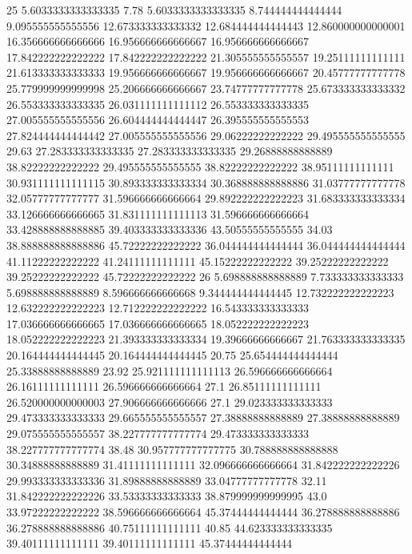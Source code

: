 25 5.6033333333333335 7.78 5.6033333333333335 8.744444444444444 9.095555555555556 12.673333333333332 12.684444444444443 12.860000000000001 16.356666666666666 16.956666666666667 16.956666666666667 17.842222222222222 17.842222222222222 21.305555555555557 19.25111111111111 21.613333333333333 19.956666666666667 19.956666666666667 20.45777777777778 25.779999999999998 25.206666666666667 23.74777777777778 25.673333333333332 26.553333333333335 26.031111111111112 26.553333333333335 27.005555555555556 26.604444444444447 26.395555555555553 27.824444444444442 27.005555555555556 29.06222222222222 29.495555555555555 29.63 27.283333333333335 27.283333333333335 29.26888888888889 38.82222222222222 29.495555555555555 38.82222222222222 38.95111111111111 30.931111111111115 30.893333333333334 30.368888888888886 31.03777777777778 32.05777777777777 31.596666666666664 29.892222222222223 31.683333333333334 33.126666666666665 31.831111111111113 31.596666666666664 33.428888888888885 39.403333333333336 43.50555555555555 34.03 38.888888888888886 45.72222222222222 36.044444444444444 36.044444444444444 41.11222222222222 41.24111111111111 45.15222222222222 39.25222222222222 39.25222222222222 45.72222222222222
26 5.698888888888889 7.733333333333333 5.698888888888889 8.596666666666668 9.344444444444445 12.732222222222223 12.632222222222223 12.712222222222222 16.543333333333333 17.036666666666665 17.036666666666665 18.052222222222223 18.052222222222223 21.393333333333334 19.39666666666667 21.763333333333335 20.164444444444445 20.164444444444445 20.75 25.654444444444444 25.33888888888889 23.92 25.921111111111113 26.596666666666664 26.16111111111111 26.596666666666664 27.1 26.85111111111111 26.520000000000003 27.906666666666666 27.1 29.023333333333333 29.473333333333333 29.665555555555557 27.38888888888889 27.38888888888889 29.075555555555557 38.227777777777774 29.473333333333333 38.227777777777774 38.48 30.957777777777775 30.788888888888888 30.34888888888889 31.41111111111111 32.096666666666664 31.842222222222226 29.993333333333336 31.89888888888889 33.04777777777778 32.11 31.842222222222226 33.53333333333333 38.879999999999995 43.0 33.97222222222222 38.596666666666664 45.37444444444444 36.278888888888886 36.278888888888886 40.75111111111111 40.85 44.623333333333335 39.40111111111111 39.40111111111111 45.37444444444444
